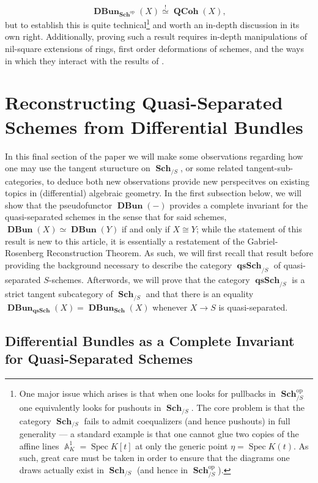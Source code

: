 \documentclass{amsart}
\theoremstyle{definition}
\DeclareMathOperator{\Abb}{\mathbb{A}}
\DeclareMathOperator{\qsSch}{\mathbf{qsSch}}
\DeclareMathOperator{\op}{op}
\DeclareMathOperator{\Spec}{Spec}
\DeclareMathOperator{\Sch}{\mathbf{Sch}}
\DeclareMathOperator{\QCoh}{\mathbf{QCoh}}
\DeclareMathOperator{\DBun}{\mathbf{DBun}}
\numberwithin{equation}{subsection}
\begin{document}
\[
\DBun_{\Sch^{\op}}(X) \overset{!}{\simeq} \QCoh(X),
\]
but to establish this is quite technical\footnote{One major issue which arises is that when one looks for pullbacks in $\Sch_{/S}^{\op}$ one equivalently looks for pushouts in $\Sch_{/S}$. The core problem is that the category $\Sch_{/S}$ fails to admit coequalizers (and hence pushouts) in full generality --- a standard example is that one cannot glue two copies of the affine lines $\Abb_K^1 = \Spec K[t]$ at only the generic point $\eta = \Spec K(t)$. As such, great care must be taken in order to ensure that the diagrams one draws actually exist in $\Sch_{/S}$ (and hence in $\Sch_{/S}^{\op}$).} and worth an in-depth discussion in its own right. Additionally, proving such a result requires in-depth manipulations of nil-square extensions of rings, first order deformations of schemes, and the ways in which they interact with the results of \cite[Section 3]{GeoffJSDiffBunComAlg}. 







\section{Reconstructing Quasi-Separated Schemes from Differential Bundles}\label{Section: Appies ofTan on Sch}

In this final section of the paper we will make some observations regarding how one may use the tangent sturucture on $\Sch_{/S}$, or some related tangent-sub-categories, to deduce both new observations provide new perspecitves on existing topics in (differential) algebraic geometry. In the first subsection below, we will show that the pseudofunctor $\DBun(-)$ provides a complete invariant for the quasi-separated schemes in the sense that for said schemes, $\DBun(X) \simeq \DBun(Y)$ if and only if $X \cong Y$; while the statement of this result is new to this article, it is essentially a restatement of the Gabriel-Rosenberg Reconstruction Theorem. As such, we will first recall that result before providing the background necessary to describe the category $\qsSch_{/S}$ of quasi-separated $S$-schemes. Afterwords, we will prove that the category $\qsSch_{/S}$ is a strict tangent subcategory of $\Sch_{/S}$ and that there is an equality $\DBun_{\qsSch}(X) = \DBun_{\Sch}(X)$ whenever $X \to S$ is quasi-separated.

\subsection{Differential Bundles as a Complete Invariant for Quasi-Separated Schemes}\label{Subsection: DBun as invariant}
\end{document}
